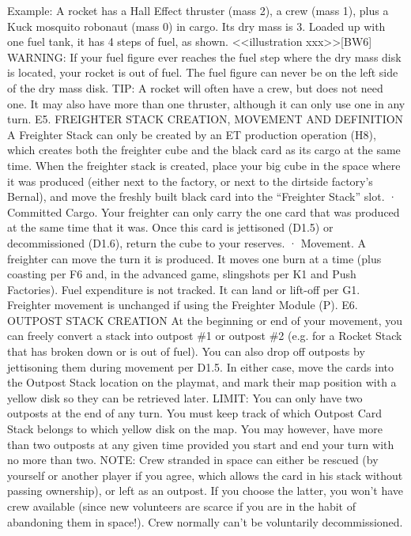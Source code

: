 \documentclass[a4paper]{book}
\begin{document}
Example: A rocket has a Hall Effect thruster (mass 2), a crew (mass 1), plus a Kuck mosquito robonaut (mass 0) in cargo. Its dry mass is 3. Loaded up with one fuel tank, it has 4 steps of fuel, as shown. <<illustration xxx>>[BW6] 
WARNING: If your fuel figure ever reaches the fuel step where the dry mass disk is located, your rocket is out of fuel. The fuel figure can never be on the left side of the dry mass disk.
TIP: A rocket will often have a crew, but does not need one. It may also have more than one thruster, although it can only use one in any turn.
E5. FREIGHTER STACK CREATION, MOVEMENT AND DEFINITION
A Freighter Stack can only be created by an ET production operation (H8), which creates both the freighter cube and the black card as its cargo at the same time. When the freighter stack is created, place your big cube in the space where it was produced (either next to the factory, or next to the dirtside factory’s Bernal), and move the freshly built black card into the “Freighter Stack” slot.
·       Committed Cargo. Your freighter can only carry the one card that was produced at the same time that it was. Once this card is jettisoned (D1.5) or decommissioned (D1.6), return the cube to your reserves.
·       Movement. A freighter can move the turn it is produced. It moves one burn at a time (plus coasting per F6 and, in the advanced game, slingshots per K1 and Push Factories). Fuel expenditure is not tracked. It can land or lift-off per G1. Freighter movement is unchanged if using the Freighter Module (P).
E6. OUTPOST STACK CREATION
At the beginning or end of your movement, you can freely convert a stack into outpost \#1 or outpost \#2 (e.g. for a Rocket Stack that has broken down or is out of fuel). You can also drop off outposts by jettisoning them during movement per D1.5. In either case, move the cards into the Outpost Stack location on the playmat, and mark their map position with a yellow disk so they can be retrieved later. 
LIMIT: You can only have two outposts at the end of any turn. You must keep track of which Outpost Card Stack belongs to which yellow disk on the map.  You may however, have more than two outposts at any given time provided you start and end your turn with no more than two.
NOTE: Crew stranded in space can either be rescued (by yourself or another player if you agree, which allows the card in his stack without passing ownership), or left as an outpost. If you choose the latter, you won’t have crew available (since new volunteers are scarce if you are in the habit of abandoning them in space!). Crew normally can’t be voluntarily decommissioned.
\end{document}
